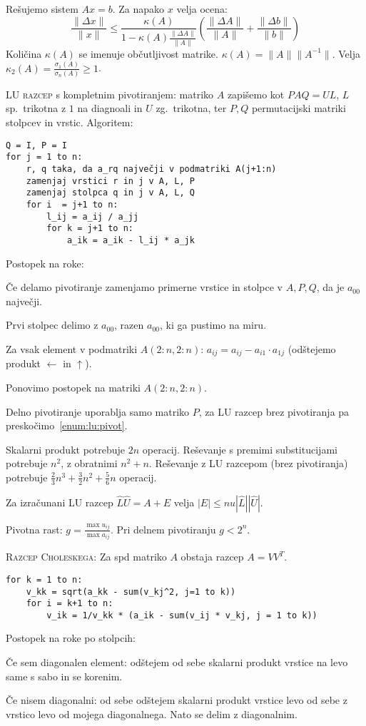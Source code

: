 \documentclass[a4paper,10pt]{article}
\theoremstyle{definition}
\newenvironment{enumerate*}%
{
\vspace{-6pt}
\begin{enumerate}
\setlength{\itemsep}{0pt}
\setlength{\parskip}{2pt}
}
{\end{enumerate}}
\begin{document}
Rešujemo sistem $Ax=b$. Za napako $x$ velja ocena:
\[ \frac{\|\Delta x\|}{\|x\|}  \leq \frac{\kappa(A)}{1-\kappa(A) \frac{\|\Delta
A\|}{\|A\|}} \left( \frac{\|\Delta A\|}{\|A\|} + \frac{\|\Delta
b\|}{\|b\|}\right) \]
Količina $\kappa(A)$ se imenuje občutljivost matrike. $\kappa(A) =
\|A\|\|A^{-1}\|$. Velja $\kappa_2(A) = \frac{\sigma_1(A)}{\sigma_n(A)} \geq 1$.

\textsc{LU razcep} s kompletnim pivotiranjem: matriko $A$ zapišemo kot $PAQ =
UL$, $L$ sp.\ trikotna z $1$ na diagnoali in $U$ zg.\ trikotna, ter $P, Q$
permutacijski matriki stolpcev in vrstic. Algoritem:
\begin{verbatim}
Q = I, P = I
for j = 1 to n:
    r, q taka, da a_rq največji v podmatriki A(j+1:n)
    zamenjaj vrstici r in j v A, L, P
    zamenjaj stolpca q in j v A, L, Q
    for i  = j+1 to n:
        l_ij = a_ij / a_jj
        for k = j+1 to n:
            a_ik = a_ik - l_ij * a_jk
\end{verbatim}

Postopek na roke:
\begin{enumerate*}
  \item * Če delamo pivotiranje zamenjamo primerne vrstice in stolpce v
    $A, P, Q$, da je $a_{00}$ največji. \label{enum:lu:pivot}
  \item Prvi stolpec delimo z $a_{00}$, razen $a_{00}$, ki ga pustimo na miru.
  \item Za vsak element v podmatriki $A(2:n, 2:n)$: $a_{ij} = a_{ij} - a_{i1} \cdot
    a_{1j}$ (odštejemo produkt  $\leftarrow$ in $\uparrow$).
  \item Ponovimo postopek na matriki $A(2:n, 2:n)$.
\end{enumerate*}

Delno pivotiranje uporablja samo matriko $P$, za LU razcep brez pivotiranja pa
preskočimo~\ref{enum:lu:pivot}.

Skalarni produkt potrebuje $2n$ operacij. Reševanje s premimi substitucijami
potrebuje $n^2$, z obratnimi $n^2+n$. Reševanje z LU razcepom (brez pivotiranja) potrebuje
$\frac23n^3 + \frac32n^2 + \frac56n$ operacij.

Za izračunani LU razcep $\hat{L}\hat{U} = A + E$ velja $|E| \leq
nu|\hat{L}||\hat{U}|$.

Pivotna rast: $g = \frac{\max u_{ij}}{\max a_{ij}}$. Pri delnem pivotiranju $g < 2^n$.

\textsc{Razcep Choleskega:}
Za spd matriko $A$ obstaja razcep $A = VV^T$.
\begin{verbatim}
for k = 1 to n:
    v_kk = sqrt(a_kk - sum(v_kj^2, j=1 to k))
    for i = k+1 to n:
        v_ik = 1/v_kk * (a_ik - sum(v_ij * v_kj, j = 1 to k))
\end{verbatim}
Postopek na roke po stolpcih:
\begin{enumerate*}
  \item Če sem diagonalen element: odštejem od sebe skalarni produkt vrstice na
    levo same s sabo in se korenim.
  \item Če nisem diagonalni: od sebe odštejem skalarni produkt vrstice levo od
    sebe z vrstico levo od mojega diagonalnega. Nato se delim z
    diagonalnim.
\end{enumerate*}
\end{document}
